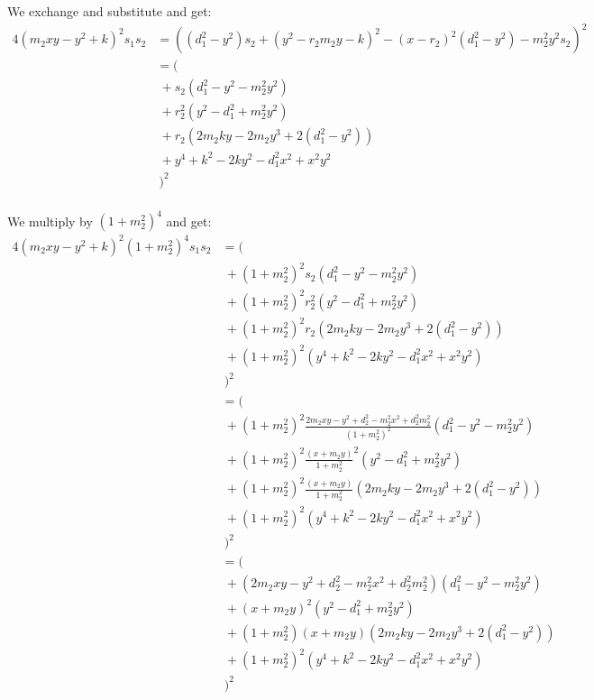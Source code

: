 \noindent
We exchange and substitute and get:
\begin{align*}
  4 (m_2 x y - y^2 + k)^2 s_1 s_2
  &= ((d_1^2 - y^2) s_2 + (y^2 - r_2 m_2 y - k)^2 - (x - r_2)^2 (d_1^2 - y^2) - m_2^2 y^2 s_2)^2\\
  &= (\\
  & ~+ s_2 (d_1^2 - y^2 - m_2^2 y^2)\\
  & ~+ r_2^2 (y^2 - d_1^2 + m_2^2 y^2)\\
  & ~+ r_2 (2 m_2 k y - 2 m_2 y^3 + 2 (d_1^2 - y^2))\\
  & ~+ y^4 + k^2 - 2 k y^2 - d_1^2 x^2 + x^2 y^2\\
  & ~)^2\\
\end{align*}

We multiply by $(1 + m_2^2)^4$ and get:
\begin{align*}
  4 (m_2 x y - y^2 + k)^2 (1 + m_2^2)^4 s_1 s_2
  &= (\\
  & ~+ (1 + m_2^2)^2 s_2 (d_1^2 - y^2 - m_2^2 y^2)\\
  & ~+ (1 + m_2^2)^2 r_2^2 (y^2 - d_1^2 + m_2^2 y^2)\\
  & ~+ (1 + m_2^2)^2 r_2 (2 m_2 k y - 2 m_2 y^3 + 2 (d_1^2 - y^2))\\
  & ~+ (1 + m_2^2)^2 (y^4 + k^2 - 2 k y^2 - d_1^2 x^2 + x^2 y^2)\\
  & ~)^2\\
  &= (\\
  & ~+ (1 + m_2^2)^2 \frac{2 m_2 x y - y^2 + d_2^2 - m_2^2 x^2 + d_2^2 m_2^2}{(1 + m_2^2)^2} (d_1^2 - y^2 - m_2^2 y^2)\\
  & ~+ (1 + m_2^2)^2 \frac{(x + m_2 y)}{1 + m_2^2}^2 (y^2 - d_1^2 + m_2^2 y^2)\\
  & ~+ (1 + m_2^2)^2 \frac{(x + m_2 y)}{1 + m_2^2} (2 m_2 k y - 2 m_2 y^3 + 2 (d_1^2 - y^2))\\
  & ~+ (1 + m_2^2)^2 (y^4 + k^2 - 2 k y^2 - d_1^2 x^2 + x^2 y^2)\\
  & ~)^2\\
  &= (\\
  & ~+ (2 m_2 x y - y^2 + d_2^2 - m_2^2 x^2 + d_2^2 m_2^2) (d_1^2 - y^2 - m_2^2 y^2)\\
  & ~+ (x + m_2 y)^2 (y^2 - d_1^2 + m_2^2 y^2)\\
  & ~+ (1 + m_2^2) (x + m_2 y) (2 m_2 k y - 2 m_2 y^3 + 2 (d_1^2 - y^2))\\
  & ~+ (1 + m_2^2)^2 (y^4 + k^2 - 2 k y^2 - d_1^2 x^2 + x^2 y^2)\\
  & ~)^2\\

\end{align*}
